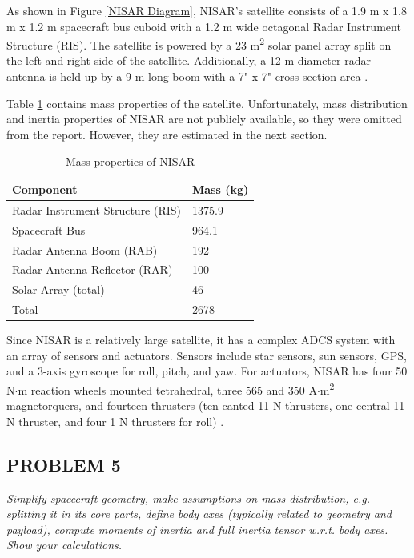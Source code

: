 As shown in Figure \ref{NISAR Diagram}, NISAR's satellite consists of a 1.9 m x 1.8 m x 1.2 m spacecraft bus cuboid with a 1.2 m wide octagonal Radar Instrument Structure (RIS). The satellite is powered by a 23 m\textsuperscript{2} solar panel array split on the left and right side of the satellite. Additionally, a 12 m diameter radar antenna is held up by a 9 m long boom with a 7" x 7" cross-section area \cite{NisarMission}.

Table \ref{NisarMassProps} contains mass properties of the satellite. Unfortunately, mass distribution and inertia properties of NISAR are not publicly available, so they were omitted from the report. However, they are estimated in the next section.

\begin{table}
\caption{Mass properties of NISAR}
\centering
\begin{tabular}{|l|l|}
\hline
\textbf{Component}               & \textbf{Mass (kg)} \\ \hline
Radar Instrument Structure (RIS) & 1375.9             \\ \hline
Spacecraft Bus                   & 964.1              \\ \hline
Radar Antenna Boom (RAB)         & 192                \\ \hline
Radar Antenna Reflector (RAR)    & 100                \\ \hline
Solar Array (total)              & 46                 \\ \hline
Total                            & 2678               \\ \hline
\end{tabular}
\label{NisarMassProps}
\end{table}

Since NISAR is a relatively large satellite, it has a complex ADCS system with an array of sensors and actuators. Sensors include star sensors, sun sensors, GPS, and a 3-axis gyroscope for roll, pitch, and yaw. For actuators, NISAR has four 50 N$\cdot$m reaction wheels mounted tetrahedral, three 565 and 350 A$\cdot$m\textsuperscript{2} magnetorquers, and fourteen thrusters (ten canted 11 N thrusters, one central 11 N thruster, and four 1 N thrusters for roll) \cite{NisarMission}.

\subsection{PROBLEM 5}
\textit{Simplify spacecraft geometry, make assumptions on mass distribution, e.g. splitting it in its core parts, define body axes (typically related to geometry and payload), compute moments of inertia and full inertia tensor w.r.t. body axes. Show your calculations.}

